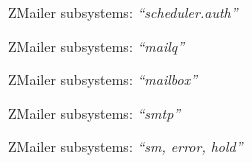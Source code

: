 \documentclass[a4paper,landscape]{slides}
\newcommand{\ZM}{ZMailer}
\begin{document}

\begin{overlay}

\centerline{\large \ZM{} subsystems: {\it ``scheduler.auth''}}

\vfill

\end{overlay}


\begin{slide}

\centerline{\large \ZM{} subsystems: {\it ``mailq''}}

\vfill

\end{slide}



\begin{slide}

\centerline{\large \ZM{} subsystems: {\it ``mailbox''}}

\vfill

\end{slide}



\begin{slide}

\centerline{\large \ZM{} subsystems: {\it ``smtp''}}

\vfill

\end{slide}



\begin{slide}

\centerline{\large \ZM{} subsystems: {\it ``sm, error, hold''}}

\vfill

\end{slide}

\end{document}
